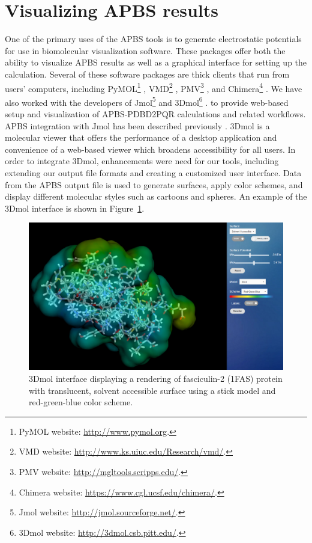 \documentclass[11pt,titlepage]{article}
\begin{document}
\section{Visualizing APBS results}
One of the primary uses of the APBS tools is to generate electrostatic potentials for use in biomolecular visualization software.
These packages offer both the ability to visualize APBS results as well as a graphical interface for setting up the calculation.
Several of these software packages are thick clients that run from users' computers, including PyMOL\footnote{PyMOL website: \url{http://www.pymol.org}.} \cite{PyMOL}, VMD\footnote{VMD website: \url{http://www.ks.uiuc.edu/Research/vmd/}.} \cite{Humphrey1996}, 
PMV\footnote{PMV website: \url{http://mgltools.scripps.edu/}.} \cite{PMV}, and Chimera\footnote{Chimera website: \url{https://www.cgl.ucsf.edu/chimera/}.} \cite{Pettersen2004}.
We have also worked with the developers of Jmol\footnote{Jmol website: \url{http://jmol.sourceforge.net/}.} \cite{Herraez2006} and 3Dmol\footnote{3Dmol website: \url{http://3dmol.csb.pitt.edu/}.} \cite{Rego2015}. to provide web-based setup and visualization of APBS-PDBD2PQR calculations and related workflows.
APBS integration with Jmol has been described previously \cite{PDB2PQRJmol}.
3Dmol is a molecular viewer that offers the performance of a desktop application and convenience of a web-based viewer which broadens accessibility for all users.
In order to integrate 3Dmol, enhancements were need for our tools, including extending our output file formats and creating a customized user interface.
Data from the APBS output file is used to generate surfaces, apply color schemes, and display different molecular styles such as cartoons and spheres.
An example of the 3Dmol interface is shown in Figure~\ref{fig:3dmol_interface}.
\begin{figure} 
	\begin{center}
		\includegraphics[width=.80\textwidth]{3dmol_interface}
		\caption{3Dmol interface displaying a rendering of fasciculin-2 (1FAS) protein with translucent, solvent accessible surface using a stick model and red-green-blue color scheme. \label{fig:3dmol_interface}}  
	\end{center}  
\end{figure}
\end{document}

